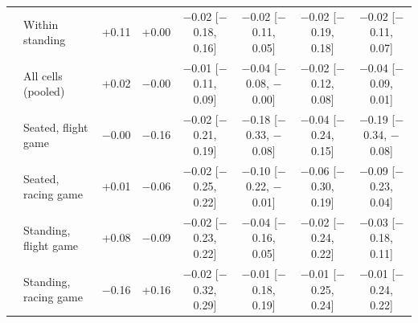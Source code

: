\begin{table}[ht]
\begin{tabular}{@{}llcccccc@{}}
 & Within standing & +0.11 & +0.00 & $-$0.02 [$-$0.18, 0.16] & $-$0.02 [$-$0.11, 0.05] & $-$0.02 [$-$0.19, 0.18] & $-$0.02 [$-$0.11, 0.07] \\
 & All cells (pooled) & +0.02 & $-$0.00 & $-$0.01 [$-$0.11, 0.09] & $-$0.04 [$-$0.08, $-$0.00] & $-$0.02 [$-$0.12, 0.08] & $-$0.04 [$-$0.09, 0.01] \\
 & Seated, flight game & $-$0.00 & $-$0.16 & $-$0.02 [$-$0.21, 0.19] & $-$0.18 [$-$0.33, $-$0.08] & $-$0.04 [$-$0.24, 0.15] & $-$0.19 [$-$0.34, $-$0.08] \\
 & Seated, racing game & +0.01 & $-$0.06 & $-$0.02 [$-$0.25, 0.22] & $-$0.10 [$-$0.22, $-$0.01] & $-$0.06 [$-$0.30, 0.19] & $-$0.09 [$-$0.23, 0.04] \\
 & Standing, flight game & +0.08 & $-$0.09 & $-$0.02 [$-$0.23, 0.22] & $-$0.04 [$-$0.16, 0.05] & $-$0.02 [$-$0.24, 0.22] & $-$0.03 [$-$0.18, 0.11] \\
 & Standing, racing game & $-$0.16 & +0.16 & $-$0.02 [$-$0.32, 0.29] & $-$0.01 [$-$0.18, 0.19] & $-$0.01 [$-$0.25, 0.24] & $-$0.01 [$-$0.24, 0.22] \\
\bottomrule
\end{tabular}
\end{table}

